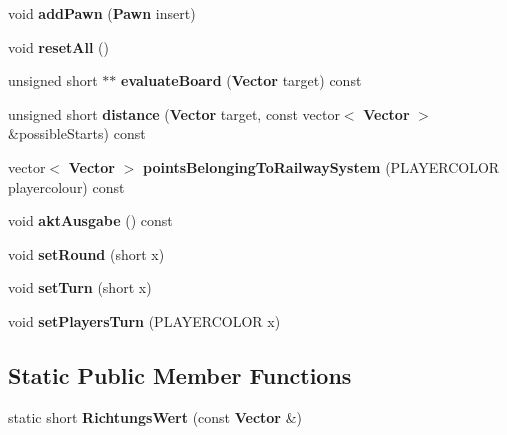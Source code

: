 \begin{DoxyCompactItemize}
\item 
void {\bfseries add\-Pawn} ({\bf Pawn} insert)\label{class_state_a9a192466fc65d42a405b6c461f5ae1c7}

\item 
void {\bfseries reset\-All} ()\label{class_state_ae3cf3d6f8fd90d8a59d53ccb1290a46c}

\item 
unsigned short $\ast$$\ast$ {\bfseries evaluate\-Board} ({\bf Vector} target) const \label{class_state_a5bc0dd359e67c72d457a64277afaf621}

\item 
unsigned short {\bfseries distance} ({\bf Vector} target, const vector$<$ {\bf Vector} $>$ \&possible\-Starts) const \label{class_state_a2e17c63ec7373cf144f37933bef1d197}

\item 
vector$<$ {\bf Vector} $>$ {\bfseries points\-Belonging\-To\-Railway\-System} (P\-L\-A\-Y\-E\-R\-C\-O\-L\-O\-R playercolour) const \label{class_state_a8797cce1b552bfb36f01cc8fba0f7e48}

\item 
void {\bfseries akt\-Ausgabe} () const \label{class_state_ade0adf3c0871edde2df2370718f0c8f6}

\item 
void {\bfseries set\-Round} (short x)\label{class_state_a468eb35199b879f9df58245540ca849c}

\item 
void {\bfseries set\-Turn} (short x)\label{class_state_a5f8cd95cb039eb5333a9fed80b7efd2f}

\item 
void {\bfseries set\-Players\-Turn} (P\-L\-A\-Y\-E\-R\-C\-O\-L\-O\-R x)\label{class_state_a100c1959a9c60fdcd3400a3fda247588}

\end{DoxyCompactItemize}
\subsection*{Static Public Member Functions}
\begin{DoxyCompactItemize}
\item 
static short {\bfseries Richtungs\-Wert} (const {\bf Vector} \&)\label{class_state_ac1f87995c4da93c0a24f0d5564b8644c}

\end{DoxyCompactItemize}
